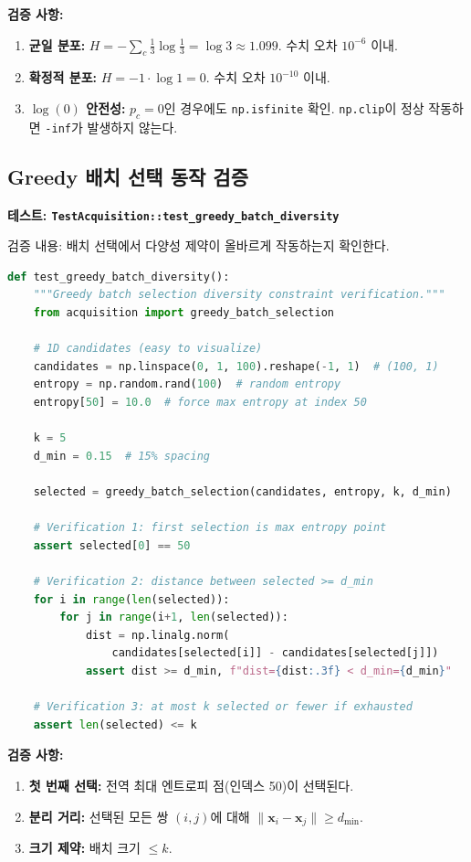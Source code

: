 \documentclass[11pt]{article}
\begin{document}
\textbf{검증 사항:}
\begin{enumerate}[label=\arabic*.]
  \item \textbf{균일 분포:} $H = -\sum_c \frac{1}{3} \log \frac{1}{3} = \log 3 \approx 1.099$. 수치 오차 $10^{-6}$ 이내.
  \item \textbf{확정적 분포:} $H = -1 \cdot \log 1 = 0$. 수치 오차 $10^{-10}$ 이내.
  \item \textbf{$\log(0)$ 안전성:} $p_c = 0$인 경우에도 \texttt{np.isfinite} 확인. \texttt{np.clip}이 정상 작동하면 \texttt{-inf}가 발생하지 않는다.
\end{enumerate}


\subsection{Greedy 배치 선택 동작 검증}

\textbf{테스트: \texttt{TestAcquisition::test\_greedy\_batch\_diversity}}

검증 내용: 배치 선택에서 다양성 제약이 올바르게 작동하는지 확인한다.

\begin{lstlisting}[language=Python]
def test_greedy_batch_diversity():
    """Greedy batch selection diversity constraint verification."""
    from acquisition import greedy_batch_selection

    # 1D candidates (easy to visualize)
    candidates = np.linspace(0, 1, 100).reshape(-1, 1)  # (100, 1)
    entropy = np.random.rand(100)  # random entropy
    entropy[50] = 10.0  # force max entropy at index 50

    k = 5
    d_min = 0.15  # 15% spacing

    selected = greedy_batch_selection(candidates, entropy, k, d_min)

    # Verification 1: first selection is max entropy point
    assert selected[0] == 50

    # Verification 2: distance between selected >= d_min
    for i in range(len(selected)):
        for j in range(i+1, len(selected)):
            dist = np.linalg.norm(
                candidates[selected[i]] - candidates[selected[j]])
            assert dist >= d_min, f"dist={dist:.3f} < d_min={d_min}"

    # Verification 3: at most k selected or fewer if exhausted
    assert len(selected) <= k
\end{lstlisting}

\textbf{검증 사항:}
\begin{enumerate}[label=\arabic*.]
  \item \textbf{첫 번째 선택:} 전역 최대 엔트로피 점(인덱스 50)이 선택된다.
  \item \textbf{분리 거리:} 선택된 모든 쌍 $(i, j)$에 대해 $\|\mathbf{x}_i - \mathbf{x}_j\| \geq d_{\min}$.
  \item \textbf{크기 제약:} 배치 크기 $\leq k$.
\end{enumerate}
\end{document}
